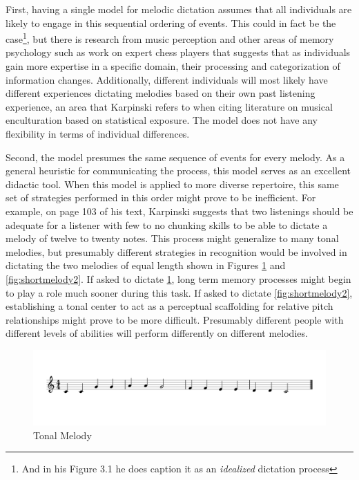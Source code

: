 \documentclass[12pt,]{book}
\let\rmarkdownfootnote\footnote%
\def\footnote{\protect\rmarkdownfootnote}
\begin{document}
First, having a single model for melodic dictation assumes that all individuals are likely to engage in this sequential ordering of events.
This could in fact be the case\footnote{And in his Figure 3.1 he does caption it as an \emph{idealized} dictation process}, but there is research from music perception \citep{goldmanImprovisationExperiencePredicts2018} and other areas of memory psychology such as work on expert chess players \citep{laneChessKnowledgePredicts2018} that suggests that as individuals gain more expertise in a specific domain, their processing and categorization of information changes.
Additionally, different individuals will most likely have different experiences dictating melodies based on their own past listening experience, an area that Karpinski refers to when citing literature on musical enculturation based on statistical exposure.
The model does not have any flexibility in terms of individual differences.

Second, the model presumes the same sequence of events for every melody.
As a general heuristic for communicating the process, this model serves as an excellent didactic tool.
When this model is applied to more diverse repertoire, this same set of strategies performed in this order might prove to be inefficient.
For example, on page 103 of his text, Karpinski suggests that two listenings should be adequate for a listener with few to no chunking skills to be able to dictate a melody of twelve to twenty notes.
This process might generalize to many tonal melodies, but presumably different strategies in recognition would be involved in dictating the two melodies of equal length shown in Figures \ref{fig:shortmelody1} and \ref{fig:shortmelody2}.
If asked to dictate \ref{fig:shortmelody1}, long term memory processes might begin to play a role much sooner during this task.
If asked to dictate \ref{fig:shortmelody2}, establishing a tonal center to act as a perceptual scaffolding for relative pitch relationships might prove to be more difficult.
Presumably different people with different levels of abilities will perform differently on different melodies.

\begin{figure}

{\centering \includegraphics[width=1\linewidth]{img/musicalexamples/MMD_Figure2-1} 

}

\caption{Tonal Melody}\label{fig:shortmelody1}
\end{figure}
\end{document}

